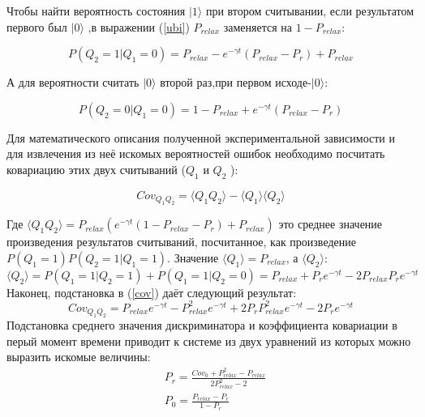 Чтобы найти вероятность состояния $|1\rangle$ при втором считывании, если результатом первого был $|0\rangle$ ,в  выражении (\ref{ubi}) $P_{relax}$ заменяется на $1-P_{relax}$:

\begin{equation}
\tag{51}
P(Q_2 = 1 | Q_1 = 0)= P_{relax} - e^{-\gamma t}(P_{relax}-P_r)+P_{relax}
\end{equation}

А для вероятности считать $|0\rangle$  второй раз,при первом исходе-$|0\rangle$:

\begin{equation}
\tag{51}
P(Q_2 = 0 | Q_1 = 0)= 1 - P_{relax} + e^{-\gamma t}(P_{relax}-P_r)
\end{equation}

 Для математического описания полученной экспериментальной зависимости и для извлечения из неё искомых вероятностей ошибок необходимо посчитать ковариацию этих двух считываний ($Q_1$  и $Q_2$ ):
 
 \begin{equation}
 \label{cov}
 \tag{52}
 Cov_{Q_1Q_2} = \langle Q_1 Q_2 \rangle - \langle Q_1\rangle\langle Q_2\rangle
 \end{equation}
 
Где $\langle Q_1 Q_2 \rangle = P_{relax}(e^{-\gamma t}(1-P_{relax}-P_r)+P_{relax})$ это среднее значение произведения результатов считываний, посчитанное, как произведение $P(Q_1 = 1) P(Q_2 = 1|Q_1 = 1)$. Значение $\langle Q_1 \rangle = P_{relax}$, а $\langle Q_2 \rangle$:
\begin{equation}
\tag{53}
\langle Q_2 \rangle = P(Q_1 = 1| Q_2 =1) + P(Q_1 = 1| Q_2 = 0)=
P_{relax}+P_re^{-\gamma t}-2P_{relax}P_re^{-\gamma t}
\end{equation}
Наконец, подстановка в (\ref{cov}) даёт следующий результат:
\begin{equation}
\tag{54}
Cov_{Q_1Q_2}= P_{relax}e^{-\gamma t}-P_{relax}^2e^{-\gamma t}+2P_rP_{relax}^2e^{-\gamma t}- 2P_re^{-\gamma t}
\end{equation}
Подстановка среднего значения дискриминатора и коэффициента ковариации в перый момент времени приводит к системе из двух уравнений из которых можно выразить искомые величины:
\begin{equation}
\tag{55}
\begin{split}
&P_r = \frac{Cov_0+P_{relax}^2-P_{relax}}{2P_{relax}^2-2}\\
&P_0 = \frac{P_{relax} - P_r}{1-P_r}
\end{split}
\end{equation}

